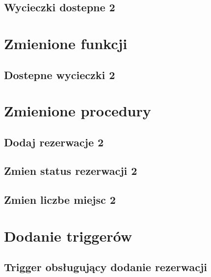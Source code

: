 \documentclass[12pt]{article}
\begin{document}
	\subsection{Wycieczki dostepne 2}
	
	
	\pagebreak
	
	\section{Zmienione funkcji}
	
	\subsection{Dostepne wycieczki 2}
	
	
	\pagebreak
	
	\section{Zmienione procedury}
	
	\subsection{Dodaj rezerwacje 2}
	
	
	\subsection{Zmien status rezerwacji 2}
	
	
	\pagebreak
	
	\subsection{Zmien liczbe miejsc 2}
	
	
	\pagebreak
	
	\section{Dodanie triggerów}
	
	\subsection{Trigger obsługujący dodanie rezerwacji}
	
	
\end{document}
